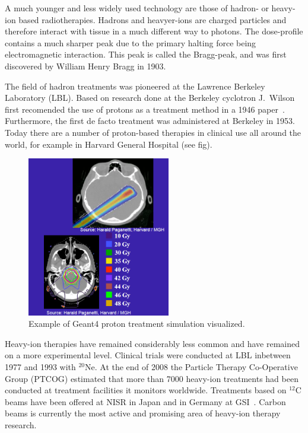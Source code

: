A much younger and less widely used technology are those of hadron- or heavy-ion based radiotherapies. Hadrons and heavyer-ions are charged particles and therefore interact with tissue in a much different way to photons. The dose-profile contains a much sharper peak due to the primary halting force being electromagnetic interaction. This peak is called the Bragg-peak, and was first discovered by William Henry Bragg in 1903.

The field of hadron treatments was pioneered at the Lawrence Berkeley Laboratory (LBL). Based on research done at the Berkeley cyclotron J.~Wilson first recomended the use of protons as a treatment method in a 1946 paper~\cite{RW46}. Furthermore, the first de facto treatment was administered at Berkeley in 1953. Today there are a number of proton-based therapies in clinical use all around the world, for example in Harvard General Hospital (see fig). %
\begin{figure}[h]
\begin{center}
\includegraphics[height=7cm]{images/HarvardHadronTreatment.png}  
\caption{\label{fig:HarvardHadron} Example of Geant4 proton treatment simulation visualized.} 
\end{center}
\end{figure} 
Heavy-ion therapies have remained considerably less common and have remained on a more experimental level. Clinical trials were conducted at LBL inbetween 1977 and 1993 with $^{20}$Ne. At the end of 2008 the Particle Therapy Co-Operative  Group (PTCOG) estimated that more than 7000 heavy-ion treatments had been conducted at treatment facilities it monitors worldwide. Treatments based on $^{12}$C beams have been offered at NISR in Japan and in Germany at GSI~\cite{PTCOGstat}. Carbon beams is currently the most active and promising area of heavy-ion therapy research. 

